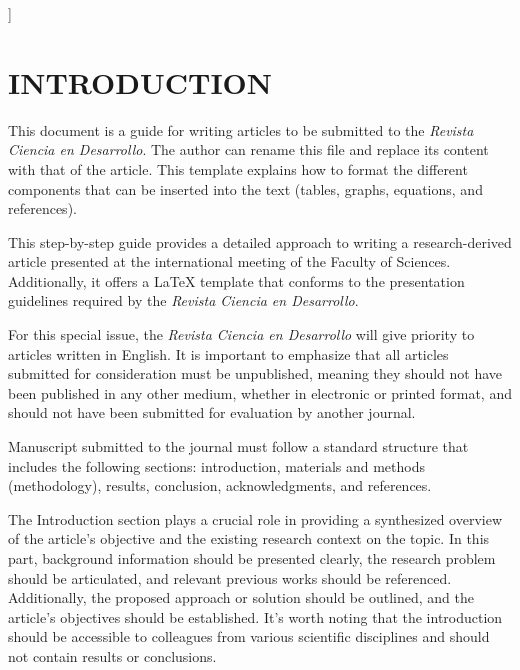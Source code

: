 \documentclass[a4paper,twocolumn,10.5pt]{article}
\begin{document}
\begin{@twocolumnfalse}
\begin{abstract}
\end{abstract}


\vspace{0.2cm}

\hspace*{0.7cm}





\vspace*{1cm} 
\end{@twocolumnfalse}]



\section{INTRODUCTION}

\justifying

This document is a guide for writing articles to be submitted to the \emph{Revista Ciencia en Desarrollo}. The author can rename this file and replace its content with that of the article. This template explains how to format the different components that can be inserted into the text (tables, graphs, equations, and references).

This step-by-step guide provides a detailed approach to writing a research-derived article presented at the international meeting of the Faculty of Sciences. Additionally, it offers a LaTeX template that conforms to the presentation guidelines required by the \emph{Revista Ciencia en Desarrollo}.

For this special issue, the \emph{Revista Ciencia en Desarrollo} will give priority to articles written in English. It is important to emphasize that all articles submitted for consideration must be unpublished, meaning they should not have been published in any other medium, whether in electronic or printed format, and should not have been submitted for evaluation by another journal.

Manuscript submitted to the journal must follow a standard structure that includes the following sections: introduction, materials and methods (methodology), results, conclusion, acknowledgments, and references.

The Introduction section plays a crucial role in providing a synthesized overview of the article's objective and the existing research context on the topic. In this part, background information should be presented clearly, the research problem should be articulated, and relevant previous works should be referenced. Additionally, the proposed approach or solution should be outlined, and the article's objectives should be established. It's worth noting that the introduction should be accessible to colleagues from various scientific disciplines and should not contain results or conclusions.
\end{document}
